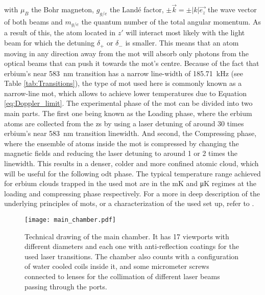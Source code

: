 with $\mu_B$ the Bohr magneton, $g_{g/e}$ the Landé factor, $\pm \vec{k} = \pm |k| \vec{e_z}$ the wave vector of both beams and $m_{g/e}$ the quantum number of the total angular momentum. As a result of this, the atom located in $z'$ will interact most likely with the light beam for which the detuning $\delta_+$ or $\delta_-$ is smaller. This means that an atom moving in any direction away from the \ac{mot} will absorb only photons from the optical beams that can push it towards the \ac{mot}'s centre. Because of the fact that erbium's near \SI{583}{\nano\meter} transition has a narrow line-width of \SI{185.71}{\kilo\hertz} (see Table \ref{tab:Transitions}), the type of \ac{mot} used here is commonly known as a narrow-line \ac{mot}, which allows to achieve lower temperatures due to Equation \eqref{eq:Doppler_limit}. The experimental phase of the \ac{mot} can be divided into two main parts. The first one being known as the Loading phase, where the erbium atoms are collected from the \ac{zs} by using a laser detuning of around 30 times erbium's near \SI{583}{\nano\meter} transition linewidth. And second, the Compressing phase, where the ensemble of atoms inside the \ac{mot} is compressed by changing the magnetic fields and reducing the laser detuning to around 1 or 2 times the linewidth. This results in a denser, colder and more confined atomic cloud, which will be useful for the following \ac{odt} phase. The typical temperature range achieved for erbium clouds trapped in the used \ac{mot} are in the \si{\milli\kelvin} and \si{\micro\kelvin} regimes at the loading and compressing phase respectively. For a more in deep description of the underlying principles of \Aclp{mot}, or a characterization of the used set up, refer to \cite{Metcalf1999, Ulitzsch2016, Roell2016}. 

\begin{figure}[!htbp]\centering
	\texttt{[image: main\_chamber.pdf]}
	\caption[Technical drawing of the main chamber]{Technical drawing of the main chamber. It has 17 viewports with different diameters and each one with anti-reflection coatings for the used laser transitions. The chamber also counts with a configuration of water cooled coils inside it, and some micrometer screws connected to lenses for the collimation of different laser beams passing through the ports. }\label{fig:main_chamber}
\end{figure}

